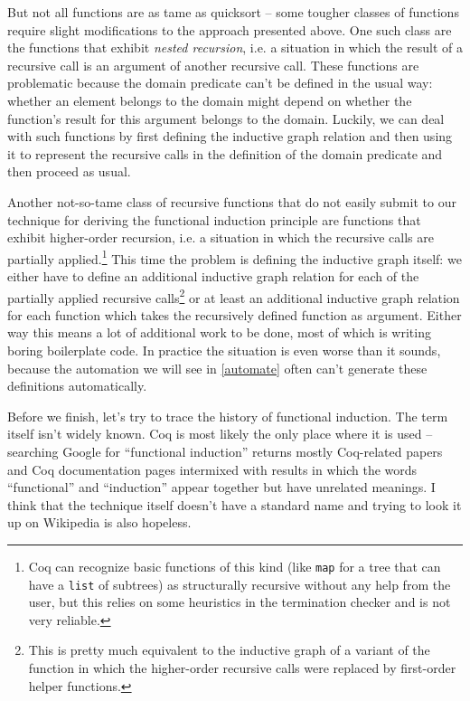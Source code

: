 \documentclass[declaration,mgr,english,shortabstract]{iithesis}
\newcommand{\m}[1]{\texttt{#1}}
\begin{document}
But not all functions are as tame as quicksort -- some tougher classes of functions require slight modifications to the approach presented above. One such class are the functions that exhibit \textit{nested recursion}, i.e. a situation in which the result of a recursive call is an argument of another recursive call. These functions are problematic because the domain predicate can't be defined in the usual way: whether an element belongs to the domain might depend on whether the function's result for this argument belongs to the domain. Luckily, we can deal with such functions by first defining the inductive graph relation and then using it to represent the recursive calls in the definition of the domain predicate and then proceed as usual.

Another not-so-tame class of recursive functions that do not easily submit to our technique for deriving the functional induction principle are functions that exhibit higher-order recursion, i.e. a situation in which the recursive calls are partially applied.\footnote{Coq can recognize basic functions of this kind (like \m{map} for a tree that can have a \m{list} of subtrees) as structurally recursive without any help from the user, but this relies on some heuristics in the termination checker and is not very reliable.} This time the problem is defining the inductive graph itself: we either have to define an additional inductive graph relation for each of the partially applied recursive calls\footnote{This is pretty much equivalent to the inductive graph of a variant of the function in which the higher-order recursive calls were replaced by first-order helper functions.} or at least an additional inductive graph relation for each function which takes the recursively defined function as argument. Either way this means a lot of additional work to be done, most of which is writing boring boilerplate code. In practice the situation is even worse than it sounds, because the automation we will see in \ref{automate} often can't generate these definitions automatically.

Before we finish, let's try to trace the history of functional induction. The term itself isn't widely known. Coq is most likely the only place where it is used -- searching Google for ``functional induction'' returns mostly Coq-related papers and Coq documentation pages intermixed with results in which the words ``functional'' and ``induction'' appear together but have unrelated meanings. I think that the technique itself doesn't have a standard name and trying to look it up on Wikipedia is also hopeless.
\end{document}
